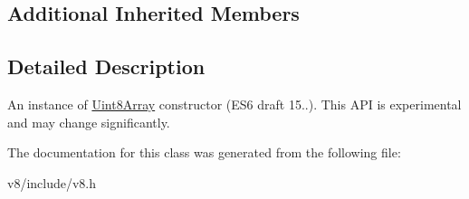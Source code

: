 \subsection*{Additional Inherited Members}


\subsection{Detailed Description}
An instance of \hyperlink{classv8_1_1Uint8Array}{Uint8\+Array} constructor (E\+S6 draft 15..). This A\+P\+I is experimental and may change significantly. 

The documentation for this class was generated from the following file\+:\begin{DoxyCompactItemize}
\item 
v8/include/v8.\+h\end{DoxyCompactItemize}
